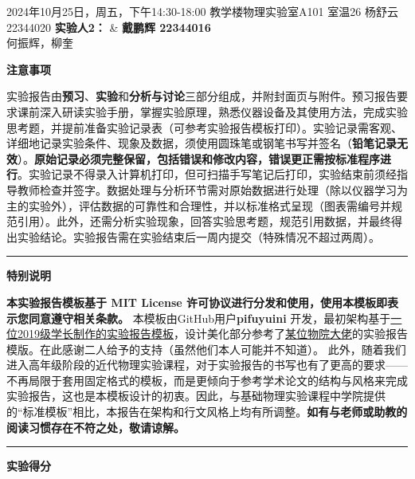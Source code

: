 
\clearpage
\thispagestyle{empty}


{2024年10月25日，周五，下午14:30-18:00}
{教学楼物理实验室A101}
{室温26\degree}
{杨舒云 22344020}
{\textcolor{fgraygreen}{\textbf{实验人2：}} &  \textbf{戴鹏辉 22344016} \\}
{何振辉，柳奎}


\noindent\textcolor{fgraygreen}{\textbf{注意事项}}

实验报告由\textbf{预习}、\textbf{实验}和\textbf{分析与讨论}三部分组成，并附封面页与附件。预习报告要求课前深入研读实验手册，掌握实验原理，熟悉仪器设备及其使用方法，完成实验思考题，并提前准备实验记录表（可参考实验报告模板打印）。实验记录需客观、详细地记录实验条件、现象及数据，须使用圆珠笔或钢笔书写并签名（\textbf{铅笔记录无效}）。\textbf{原始记录必须完整保留，包括错误和修改内容，错误更正需按标准程序进行}。实验记录不得录入计算机打印，但可扫描手写笔记后打印，实验结束前须经指导教师检查并签字。数据处理与分析环节需对原始数据进行处理（除以仪器学习为主的实验外），评估数据的可靠性和合理性，并以标准格式呈现（图表需编号并规范引用）。此外，还需分析实验现象，回答实验思考题，规范引用数据，并最终得出实验结论。实验报告需在实验结束后一周内提交（特殊情况不超过两周）。

	
\noindent\textcolor{fgraygreen}{\rule{\textwidth}{1.5pt} }

\noindent\textcolor{fgraygreen}{\textbf{特别说明}}

\textbf{本实验报告模板基于 MIT License 许可协议进行分发和使用，使用本模板即表示您同意遵守相关条款。}
本模板由GitHub用户\textbf{pifuyuini} 开发，最初架构基于\href{https://huanyushi.github.io/posts/labreport-template/}{一位2019级学长制作的实验报告模板}，设计美化部分参考了\href{https://www.yykspace.com/cn/index.html}{某位物院大佬}的实验报告模版。在此感谢二人给予的支持（虽然他们本人可能并不知道）。
此外，随着我们进入高年级阶段的近代物理实验课程，对于实验报告的书写也有了更高的要求——不再局限于套用固定格式的模板，而是更倾向于参考学术论文的结构与风格来完成实验报告，这也是本模板设计的初衷。因此，与基础物理实验课程中学院提供的“标准模板”相比，本报告在架构和行文风格上均有所调整。\textbf{如有与老师或助教的阅读习惯存在不符之处，敬请谅解。}

\noindent\textcolor{fgraygreen}{\rule{\textwidth}{1.5pt} }

\noindent\textcolor{fgraygreen}{\textbf{实验得分}}

\scoresTable{}{}{}{}{}{}{}{}
	

	

\clearpage
\tableofcontents		